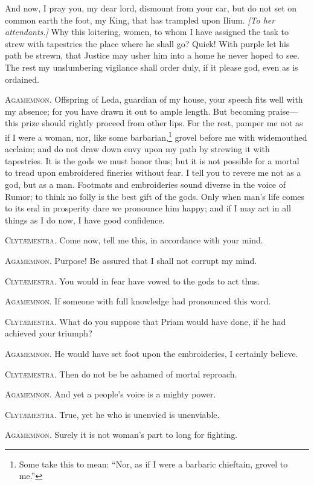 \documentclass[12pt]{article}
\begin{document}
And now, I pray you, my dear lord, dismount from your car, but do not set on common earth the foot, my King, that has trampled upon Ilium. \textit{[To her attendants.]} Why this loitering, women, to whom I have assigned the task to strew with tapestries the place where he shall go? Quick! With purple let his path be strewn, that Justice may usher him into a home he never hoped to see. The rest my unslumbering vigilance shall order duly, if it please god, even as is ordained.

\textsc{Agamemnon.} Offspring of Leda, guardian of my house, your speech fits well with my absence; for you have drawn it out to ample length. But becoming praise---this prize should rightly proceed from other lips. For the rest, pamper me not as if I were a woman, nor, like some barbarian,\footnote{Some take this to mean: ``Nor, as if I were a barbaric chieftain, grovel to me.''} grovel before me with widemouthed acclaim; and do not draw down envy upon my path by strewing it with tapestries. It is the gods we must honor thus; but it is not possible for a mortal to tread upon embroidered fineries without fear. I tell you to revere me not as a god, but as a man. Footmats and embroideries sound diverse in the voice of Rumor; to think no folly is the best gift of the gods. Only when man's life comes to its end in prosperity dare we pronounce him happy; and if I may act in all things as I do now, I have good confidence.

\textsc{Clyt{\ae}mestra.} Come now, tell me this, in accordance with your mind.

\textsc{Agamemnon.} Purpose! Be assured that I shall not corrupt my mind.

\textsc{Clyt{\ae}mestra.} You would in fear have vowed to the gods to act thus.

\textsc{Agamemnon.} If someone with full knowledge had pronounced this word.

\textsc{Clyt{\ae}mestra.} What do you suppose that Priam would have done, if he had achieved your triumph?

\textsc{Agamemnon.} He would have set foot upon the embroideries, I certainly believe.

\textsc{Clyt{\ae}mestra.} Then do not be be ashamed of mortal reproach.

\textsc{Agamemnon.} And yet a people's voice is a mighty power.

\textsc{Clyt{\ae}mestra.} True, yet he who is unenvied is unenviable.

\textsc{Agamemnon.} Surely it is not woman's part to long for fighting.
\end{document}
